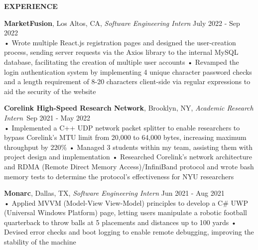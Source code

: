 \documentclass{resume} %
\begin{document}
\begin{rSection}{\textbf{EXPERIENCE}}

\textbf{MarketFusion}, Los Altos, CA, {\emph{Software Engineering Intern}} \hfill July 2022 - Sep 2022 \\
• Wrote multiple React.js registration pages and designed the user-creation process, sending server requests via the Axios library to the internal MySQL database, facilitating the creation of multiple user accounts \newline
• Revamped the login authentication system by implementing 4 unique character password checks and a length requirement of 8-20 characters client-side via regular expressions to aid the security of the website 

\textbf{Corelink High-Speed Research Network}, Brooklyn, NY, {\emph{Academic Research Intern}}\ \hfill Sep 2021 - May 2022 \\
• Implemented a C++ UDP network packet splitter to enable researchers to bypass Corelink's MTU limit from 20,000 to 64,000 bytes, increasing maximum throughput by 220\% \newline
• Managed 3 students within my team, assisting them with project design and implementation \newline
• Researched Corelink’s network architecture and RDMA (Remote Direct Memory Access)/InfiniBand protocol and wrote bash memory tests to determine the protocol's effectiveness for NYU researchers

\textbf{Monarc}, Dallas, TX, {\emph{Software Engineering Intern}} \hfill Jun 2021 - Aug 2021 \\
• Applied MVVM (Model-View View-Model) principles to develop a C\# UWP (Universal Windows Platform) page, letting users manipulate a robotic football quarterback to throw balls at 5 placements and distances up to 100 yards \newline  %
• Devised error checks and boot logging to enable remote debugging, improving the stability of the machine \smallskip
\end{rSection} 
\end{document}
